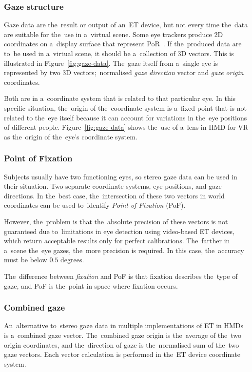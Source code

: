 \pagebreak{}
\subsubsection*{Gaze structure}

Gaze data are the~result or output of an~ET device, but not every time the~data are suitable for the~use in a~virtual scene. Some eye trackers produce 2D coordinates on a~display surface that represent PoR~\cite{ugwitz2022}. If the~produced data are to~be used in a~virtual scene, it should be a~collection of 3D vectors. This is illustrated in Figure~\ref{fig:gaze-data}. The~gaze itself from a~single eye is represented by two 3D vectors;~normalised \emph{gaze direction} vector and \emph{gaze origin} coordinates.

Both are in a~coordinate system that is related to that particular eye. In this specific situation, the~origin of the~coordinate system is a~fixed point that is not related to the~eye itself because it can account for variations in the~eye positions of different people. Figure~\ref{fig:gaze-data} shows the~use of a~lens in HMD for VR as the~origin of the~eye's coordinate system.

\subsubsection*{Point of Fixation}
Subjects usually have two functioning eyes, so stereo gaze data can be used in their situation. Two separate coordinate systems, eye positions, and gaze directions. In the~best case, the~intersection of these two vectors in world coordinates can be used to~identify \emph{Point of Fixation} (PoF).

However, the~problem is that the~absolute precision of these vectors is not guaranteed due to~limitations in eye detection using video-based ET devices, which return acceptable results only for perfect calibrations. The~farther in a~scene the~eye gazes, the~more precision is required. In this case, the~accuracy must be below $0.5$ degrees.

The~difference between \emph{fixation} and PoF is that fixation describes the~type of gaze, and PoF is the~point in space where fixation occurs.

\subsubsection*{Combined gaze}
An~alternative to~stereo gaze data in multiple implementations of ET in HMDs is a~combined gaze vector. The~combined gaze origin is the~average of the~two origin coordinates, and the~direction of gaze is the~normalised sum of the~two gaze vectors. Each vector calculation is performed in the~ET device coordinate system.

